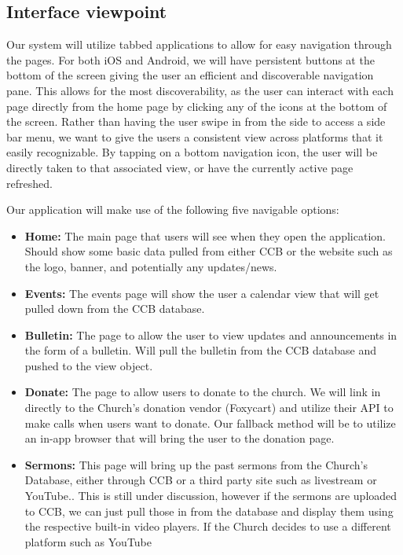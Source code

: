 \documentclass[letterpaper,10pt,draftclsnofoot,onecolumn,titlepage]{IEEEtran}
\begin{document}
		\subsection{Interface viewpoint}
			Our system will utilize tabbed applications to allow for easy navigation through the pages.
			For both \gls{iOS} and \gls{Android}, we will have persistent buttons at the bottom of the screen giving the user an efficient and discoverable navigation pane.
			This allows for the most discoverability, as the user can interact with each page directly from the home page by clicking any of the icons at the bottom of the screen.
			Rather than having the user swipe in from the side to access a side bar menu, we want to give the users a consistent view across platforms that it easily recognizable.
			By tapping on a bottom navigation icon, the user will be directly taken to that associated view, or have the currently active page refreshed.

			Our application will make use of the following five navigable options:
			\begin{itemize}
				\item \textbf{Home:} The main page that users will see when they open the application. Should show some basic data pulled from either CCB or the website such as the logo, banner, and potentially any updates/news.
				\item \textbf{Events:} The events page will show the user a calendar view that will get pulled down from the CCB database.
				\item \textbf{Bulletin:} The page to allow the user to view updates and announcements in the form of a bulletin. Will pull the bulletin from the CCB database and pushed to the view object.
				\item \textbf{Donate:} The page to allow users to donate to the church. We will link in directly to the Church's donation vendor (Foxycart) and utilize their API to make calls when users want to donate.
					Our fallback method will be to utilize an in-app browser that will bring the user to the donation page.
				\item \textbf{Sermons:} This page will bring up the past sermons from the Church's Database, either through CCB or a third party site such as livestream or YouTube..
					This is still under discussion, however if the sermons are uploaded to CCB, we can just pull those in from the database and display them using the respective built-in video players.
					If the Church decides to use a different platform such as YouTube
			\end{itemize}
\end{document}
